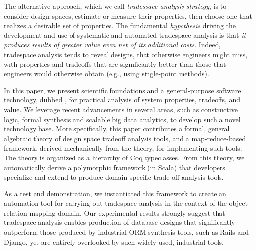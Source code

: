 \documentclass{sig-alternate}
\begin{document}
The alternative approach, which we call {\em tradespace analysis strategy}, is to consider design spaces, estimate or measure their properties,  then choose one that realizes a desirable set of properties. 
The fundamental {\em hypothesis} driving the development and use of systematic and automated tradespace analysis is that {\em it produces results of greater value even net of its additional costs}. %
Indeed, tradespace analysis tends to reveal designs, that otherwise engineers might miss, with properties and tradeoffs that are significantly better than those that engineers would otherwise obtain (e.g., using single-point methods). %


In this paper, we present scientific foundations and a general-purpose software technology, dubbed \@approach, for practical analysis of system properties, tradeoffs, and value. We leverage recent advancements in several areas, such as constructive logic, formal synthesis and scalable big data analytics, to develop such a novel technology base.
More specifically, this paper contributes a formal, general algebraic theory of design space tradeoff analysis tools, and a map-reduce-based framework, derived mechanically from the theory, for implementing such tools. The theory is organized as a hierarchy of Coq typeclasses. From this theory, we automatically derive a polymorphic framework (in Scala) that developers specialize and extend to produce domain-specific trade-off analysis tools.

As a test and demonstration, we instantiated this framework to create an automation tool %
for carrying out tradespace analysis in the context of the object-relation mapping domain.
Our experimental results strongly suggest that %
\@approach tradespace analysis enables production of database designs that significantly outperform those produced by %
industrial ORM synthesis tools, such as Rails and Django, yet are entirely overlooked by such widely-used, industrial tools. %

\end{document}
